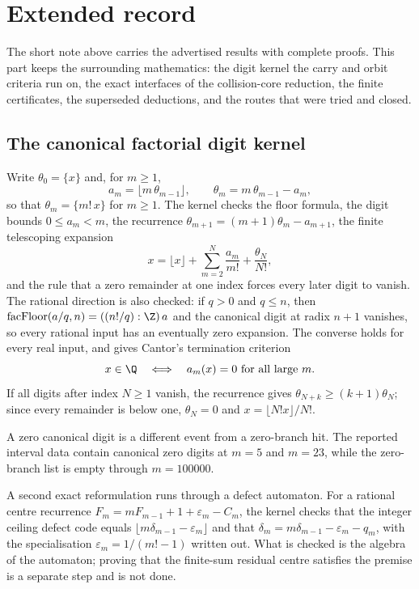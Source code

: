 
\section{Extended record}\label{long68:sec:extended-record}

The short note above carries the advertised results with complete proofs.
This part keeps the surrounding mathematics: the digit kernel the carry and
orbit criteria run on, the exact interfaces of the collision-core reduction,
the finite certificates, the superseded deductions, and the routes that were
tried and closed.

\subsection{The canonical factorial digit kernel}\label{long68:sec:ext-digits}

Write $\theta_0=\{x\}$ and, for $m\ge1$,
\[
 a_m=\lfloor m\,\theta_{m-1}\rfloor,\qquad \theta_m=m\,\theta_{m-1}-a_m ,
\]
so that $\theta_m=\{m!\,x\}$ for $m\ge1$.  The kernel checks the floor
formula, the digit bounds $0\le a_m<m$, the recurrence
$\theta_{m+1}=(m+1)\theta_m-a_{m+1}$, the finite telescoping expansion
\[
 x=\lfloor x\rfloor+\sum_{m=2}^{N}\frac{a_m}{m!}+\frac{\theta_N}{N!},
\]
and the rule that a zero remainder at one index forces every later digit to
vanish.  The rational direction is also checked: if $q>0$ and $q\le n$, then
$\operatorname{facFloor}(a/q,n)=((n!/q):\Z)\,a$ and the canonical digit at
radix $n+1$ vanishes, so every rational input has an eventually zero
expansion.  The converse holds for every real input, and gives Cantor's
termination criterion \cite{cantor1869}
\[
 x\in\Q\quad\Longleftrightarrow\quad a_m(x)=0\ \hbox{for all large }m .
\]
If all digits after index $N\ge1$ vanish, the recurrence gives
$\theta_{N+k}\ge(k+1)\theta_N$; since every remainder is below one,
$\theta_N=0$ and $x=\lfloor N!x\rfloor/N!$.

A zero canonical digit is a different event from a zero-branch hit.  The
reported interval data contain canonical zero digits at $m=5$ and $m=23$,
while the zero-branch list is empty through $m=100000$.

A second exact reformulation runs through a defect automaton.  For a rational
centre recurrence $F_m=mF_{m-1}+1+\varepsilon_m-C_m$, the kernel checks that
the integer ceiling defect code equals
$\lfloor m\delta_{m-1}-\varepsilon_m\rfloor$ and that
$\delta_m=m\delta_{m-1}-\varepsilon_m-q_m$, with the specialisation
$\varepsilon_m=1/(m!-1)$ written out.  What is checked is the algebra of the
automaton; proving that the finite-sum residual centre satisfies the premise
is a separate step and is not done.

